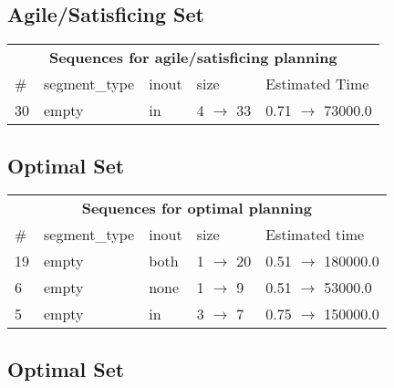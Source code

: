 \documentclass{article}
\begin{document}
                         \subsection*{Agile/Satisficing Set}

                        \begin{center}
                        \begin{tabular}{l|l|l|l|l}
                        \multicolumn{5}{c}{\bf \large Sequences for agile/satisficing planning}\\
                        \# & segment\_type & inout & size & Estimated Time\\\midrule
                        30&empty&in&4 $\rightarrow$ 33&0.71 $\rightarrow$ 73000.0
                        \end{tabular}
                        \end{center}
                    
                            \subsection*{Optimal Set}

                            \begin{center}
                            \begin{tabular}{l|l|l|l|l}
                            \multicolumn{5}{c}{\bf \large Sequences for optimal planning}\\
                            \# & segment\_type & inout & size & Estimated time\\\midrule
                            19&empty&both&1 $\rightarrow$ 20&0.51 $\rightarrow$ 180000.0\\
6&empty&none&1 $\rightarrow$ 9&0.51 $\rightarrow$ 53000.0\\
5&empty&in&3 $\rightarrow$ 7&0.75 $\rightarrow$ 150000.0
                            \end{tabular}
                            \end{center}
                    
                                \subsection*{Optimal Set}
                                
\end{document}
